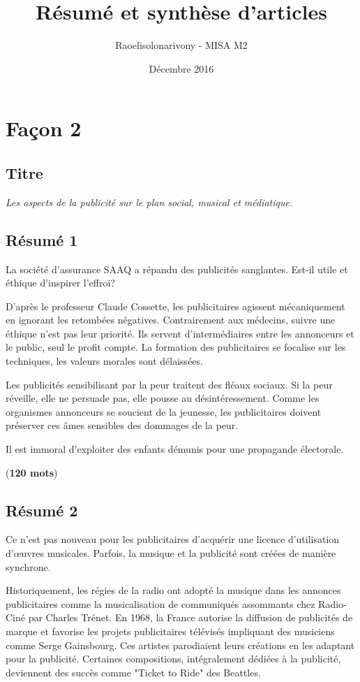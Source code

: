 \documentclass[11pt]{article}
\title{Résumé et synthèse d'articles}
\author{Raoelisolonarivony - MISA M2}
\date{Décembre 2016}
\begin{document}
\section{Façon 2}

\subsection{Titre}

\emph{\large Les aspects de la publicité sur le plan social, musical et médiatique.}

\subsection{Résumé 1}

La société d'assurance SAAQ a répandu des publicités sanglantes. Est-il utile et éthique d'inspirer l'effroi? 

D'après le professeur Claude Cossette, les publicitaires agissent mécaniquement en ignorant les retombées négatives. Contrairement aux médecins, suivre une éthique n'est pas leur priorité. Ils servent d'intermédiaires entre les annonceurs et le public, seul le profit compte. La formation des publicitaires se focalise sur les techniques, les valeurs morales sont délaissées. 

Les publicités sensibilisant par la peur traitent des fléaux sociaux. Si la peur réveille, elle ne persuade pas, elle pousse au désintéressement. Comme les organismes annonceurs se soucient de la jeunesse, les publicitaires doivent préserver ces âmes sensibles des dommages de la peur. 

Il est immoral d'exploiter des enfants démunis pour une propagande électorale. 

(\textbf{120 mots})

\subsection{Résumé 2}

Ce n'est pas nouveau pour les publicitaires d'acquérir une licence d'utilisation d'\oe uvres musicales. Parfois, la musique et la publicité sont créées de manière synchrone.

Historiquement, les régies de la radio ont adopté la musique dans les annonces publicitaires comme la musicalisation de communiqués assommants chez Radio-Ciné par Charles Trénet.
En 1968, la France autorise la diffusion de publicités de marque et favorise les projets publicitaires télévisés impliquant des musiciens comme Serge Gainsbourg.
Ces artistes parodiaient leurs créations en les adaptant pour la publicité. Certaines compositions, intégralement dédiées à la publicité, deviennent des succès comme "Ticket to Ride" des Beattles.
 
\end{document}
